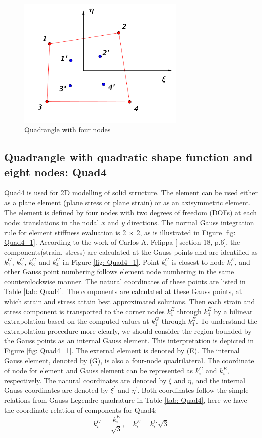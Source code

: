\begin{figure}[h]
	\begin{center}
		\includegraphics[width=8cm,clip]{DirectCalculation.pdf}			
		\caption{Quadrangle with four nodes}	\label{fig: DirectCalculation}
	\end{center} 
\end{figure}

\subsection{Quadrangle with quadratic shape function and eight nodes: Quad4} \label{Quad4}
Quad4 is used for 2D modelling of solid structure. The element can be used either as a plane element (plane stress or plane strain) or as an axisymmetric element. The element is defined by four nodes with two degrees of freedom (DOFs) at each node: translations in the nodal $x$ and $y$ directions. The normal Gauss integration rule for element stiffness evaluation is 2 $\times$ 2, as is illustrated in Figure \ref{fig: Quad4_1}. According to the work of Carlos A. Felippa [\cite{Felippa} section 18, p.6], the components(strain, stress) are calculated at the Gauss points and are identified as $k_1^G$, $k_2^G$, $k_3^G$ and $k_4^G$ in Figure \ref{fig: Quad4_1}. Point $k_i^G$ is closest to node $k_i^E$, and other Gauss point numbering follows element node numbering in the same counterclockwise manner. The natural coordinates of these points are listed in Table \ref{tab: Quad4}. The components are calculated at these Gauss points, at which strain and stress attain best approximated solutions. Then each strain and stress component is transported to the corner nodes $k_1^E$ through $k_4^E$ by a bilinear extrapolation based on the computed values at $k_1^G$ through $k_4^E$. To understand the extrapolation procedure more clearly, we should consider the region bounded by the Gauss points as an internal Gauss element. This interpretation is depicted in Figure \ref{fig: Quad4_1}. The external element is denoted by (E). The internal Gauss element, denoted by (G), is also a four-node quadrilateral. The coordinate of node for element and Gauss element can be represented as $k_i^G$ and $k_i^E$, respectively. The natural coordinates are denoted by $\xi$ and $\eta$, and the internal Gauss coordinates are denoted by $\xi^{\prime}$ and $\eta^{\prime}$.  Both coordinates follow the simple relations from Gauss-Legendre quadrature in Table \ref{tab: Quad4}, here we have the coordinate relation of components for Quad4:
\begin{equation}
k_i^G = \frac{k_i^E}{\sqrt{3}},\quad
k_i^E= k_i^G\sqrt{3}
\end{equation}

